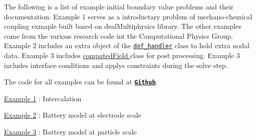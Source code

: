 The following is a list of example initial boundary value problems and their documentation. Example 1 serves as a introductary problem of mechano-\/chemical coupling exmaple built based on deal\-Multiphysics library. The other examples come from the various research code int the Computational Physics Group. Example 2 includes an extra object of the \href{https://www.dealii.org/8.5.0/doxygen/deal.II/classDoFHandler.html}{\tt dof\-\_\-handler} class to hold extra nodal data. Example 3 includes \hyperlink{}{computed\-Field } class for post processing. Example 3 includes interface conditions and applys constraints during the solve step.

The code for all examples can be found at \href{https://github.com/mechanoChem/mechanoChemFEM/tree/example}{\tt {\bfseries Github}}.

\hyperlink{_intercalation}{Example 1} \-: Intercalation \par
 \hyperlink{battery_electrode_scale}{Example 2} \-: Battery model at electrode scale\par
 \hyperlink{battery_particle}{Example 3} \-: Battery model at particle scale\par
